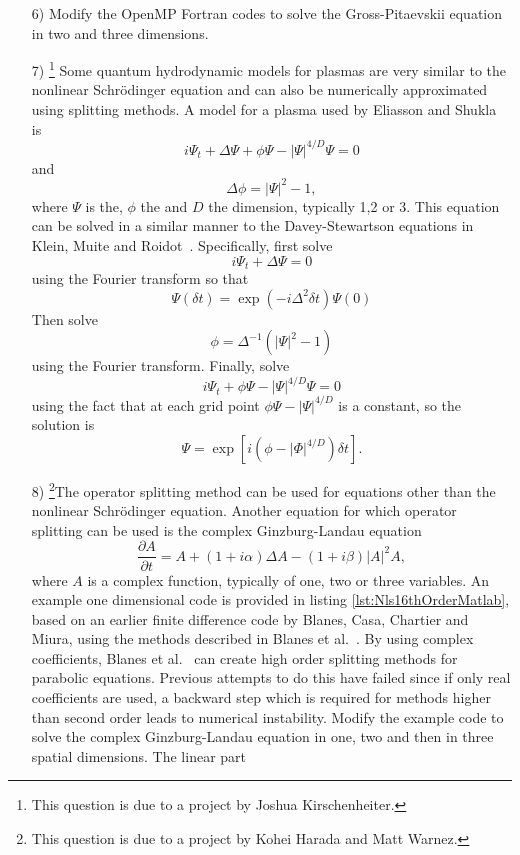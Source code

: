 \begin{enumerate}


\item[6)] Modify the OpenMP Fortran codes to solve the Gross-Pitaevskii equation in two and three dimensions.
\item[7)] \footnote{This question is due to a project by Joshua Kirschenheiter.} Some quantum hydrodynamic models for plasmas are very similar to the nonlinear Schr\"{o}dinger equation and can also be numerically approximated using splitting methods.  A model for a plasma used by Eliasson and Shukla~\cite{EliShu09} is
$$i\Psi_t+\Delta \Psi + \phi\Psi - \lvert \Psi \rvert^{4/D}\Psi=0$$
and 
$$ \Delta \phi =\lvert \Psi \rvert^2-1,$$
where $\Psi$ is the, $\phi$ the and $D$ the dimension, typically 1,2 or 3. This equation can be solved in a similar manner to the Davey-Stewartson equations in Klein, Muite and Roidot~\cite{KleMuiRoi11}. Specifically, first solve
$$i\Psi_t+\Delta \Psi=0$$
using the Fourier transform so that
$$\Psi(\delta t)=\exp\left(-i\Delta^2 \delta t\right)\Psi(0)$$
Then solve
$$\phi=\Delta^{-1}\left(\lvert \Psi \rvert^2-1\right)$$
using the Fourier transform.  Finally, solve
$$i\Psi_t+ \phi\Psi - \lvert \Psi \rvert^{4/D}\Psi=0$$
using the fact that at each grid point $\phi\Psi - \lvert \Psi \rvert^{4/D}$ is a constant, so the solution is
$$\Psi=\exp\left[ i\left(\phi-\lvert \Phi \rvert^{4/D}\right)\delta t\right].$$
\item[8)] \footnote{This question is due to a project by Kohei Harada and Matt Warnez.}The operator splitting method can be used for equations other than the nonlinear Schr\"{o}dinger equation. Another equation for which operator splitting can be used is the complex Ginzburg-Landau equation
$$\frac{\partial A}{\partial t}=A+(1+i\alpha)\Delta A- (1+i\beta)|A|^2A,$$
where $A$ is a complex function, typically of one, two or three variables. An example one dimensional code is provided in listing \ref{lst:Nls16thOrderMatlab}, based on an earlier finite difference code by Blanes, Casa, Chartier and Miura, using the methods described in Blanes et al.~\cite{BlaCasChaMur12}. By using complex coefficients,  Blanes et al.~\cite{BlaCasChaMur12} can create high order splitting methods for parabolic equations. Previous attempts to do this have failed since if only real coefficients are used, a backward step which is required for methods higher than second order leads to numerical instability. Modify the example code to solve the complex Ginzburg-Landau equation in one, two and then in three spatial dimensions. The linear part

\end{enumerate}
